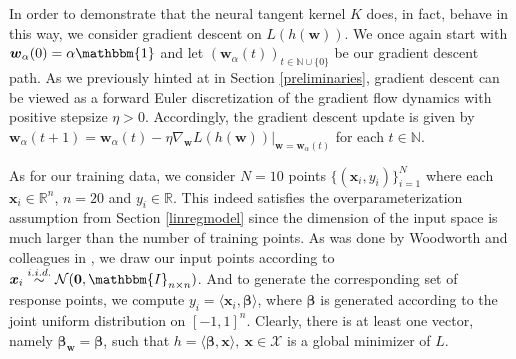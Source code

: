 \documentclass{article}
\begin{document}
In order to demonstrate that the neural tangent kernel $K$ does, in fact, behave in this way, we consider gradient descent on $L(h(\boldsymbol{w}))$.  We once again start with $\boldsymbol{w}_{\alpha}(0) = \alpha \mathbbm{1}$ and let $(\boldsymbol{w}_{\alpha}(t))_{t \in \mathbb{N}\cup \{0\}}$ be our gradient descent path. As we previously hinted at in Section \ref{preliminaries}, gradient descent can be viewed as a forward Euler discretization of the gradient flow dynamics with positive stepsize $\eta > 0$. Accordingly, the gradient descent update is given by $\boldsymbol{w}_{\alpha}(t+1) = \boldsymbol{w}_{\alpha}(t) - \eta \nabla_{\boldsymbol{w}} L(h(\boldsymbol{w}))|_{\boldsymbol{w} = \boldsymbol{w}_{\alpha}(t)}$ for each $t \in \mathbb{N}$.

As for our training data, we consider $N=10$ points $\{ (\boldsymbol{x}_i, y_i) \}_{i=1}^N$ where each $\boldsymbol{x}_i \in \mathbb{R}^{n}$, $n = 20$ and $y_i \in \mathbb{R}$. This indeed satisfies the overparameterization assumption from Section \ref{linregmodel} since the dimension of the input space is much larger than the number of training points. As was done by Woodworth and colleagues in \cite{woodworth2020kernel}, we draw our input points according to $\boldsymbol{x}_i \overset{i.i.d.}{\sim} \mathcal{N}(\boldsymbol{0}, \mathbbm{I}_{n \times n})$. And to generate the corresponding set of response points, we compute $y_i = \langle \boldsymbol{x}_i, \boldsymbol{\beta} \rangle$, where $\boldsymbol{\beta}$ is generated according to the joint uniform distribution on $[-1, 1]^n$. Clearly, there is at least one vector, namely $\boldsymbol{\beta}_{\boldsymbol{w}} = \boldsymbol{\beta}$, such that $h = \langle \boldsymbol{\beta}, \boldsymbol{x} \rangle, \ \boldsymbol{x} \in \mathcal{X}$ is a global minimizer of $L$.
\end{document}
